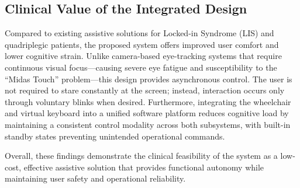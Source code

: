 \subsection{Clinical Value of the Integrated Design}
\label{subsec:clinical_value_integrated_design}

Compared to existing assistive solutions for Locked-in Syndrome (LIS) and quadriplegic
patients, the proposed system offers improved user comfort and lower cognitive strain.
Unlike camera-based eye-tracking systems that require continuous visual focus---causing
severe eye fatigue and susceptibility to the ``Midas Touch'' problem---this design
provides asynchronous control. The user is not required to stare constantly at the
screen; instead, interaction occurs only through voluntary blinks when desired.
Furthermore, integrating the wheelchair and virtual keyboard into a unified software
platform reduces cognitive load by maintaining a consistent control modality across
both subsystems, with built-in standby states preventing unintended operational commands.

Overall, these findings demonstrate the clinical feasibility of the system as a
low-cost, effective assistive solution that provides functional autonomy while
maintaining user safety and operational reliability.
